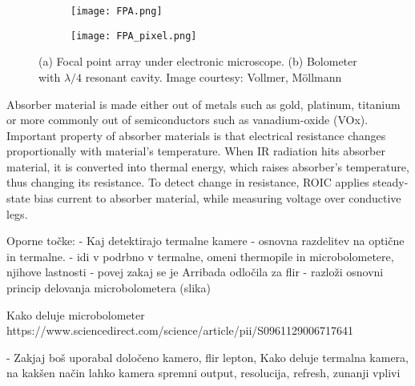 \begin{figure}[h]
    \begin{subfigure}{0.5\textwidth}
        \centering
        \texttt{[image: FPA.png]} 
        \caption{}
        \label{FPA}
    \end{subfigure}
    \begin{subfigure}{0.5\textwidth}
        \centering
        \texttt{[image: FPA\_pixel.png]}
        \caption{}
        \label{FPA_pixel}
    \end{subfigure}

    \caption{(a) Focal point array under electronic microscope. (b) Bolometer with $\lambda /4$ resonant cavity. Image courtesy: Vollmer, Möllmann\cite{thermal_book}}
    \label{FPA_microbolo}
\end{figure}

Absorber material is made either out of metals such as gold, platinum, titanium or more commonly out of semiconductors such as vanadium-oxide (VOx)\cite{thermal_article}.
Important property of absorber materials is that electrical resistance changes proportionally with material's temperature\cite{thermal_book}.
When IR radiation hits absorber material, it is converted into thermal energy, which raises absorber's temperature, thus changing its resistance.
To detect change in resistance, ROIC applies steady-state bias current to absorber material, while measuring voltage over conductive legs\cite{thermal_book}. 





Oporne točke:
 - Kaj detektirajo termalne kamere
 - osnovna razdelitev na optične in termalne.
 - idi v podrbno v termalne, omeni thermopile in microbolometere, njihove lastnosti
 - povej zakaj se je Arribada odločila za flir
 - razloži osnovni princip delovanja microbolometera (slika)

Kako deluje microbolometer
https://www.sciencedirect.com/science/article/pii/S0961129006717641

    - Zakjaj boš uporabal določeno kamero, flir lepton, Kako deluje termalna kamera, na kakšen način lahko kamera spremni output, resolucija, refresh, zunanji vplivi

